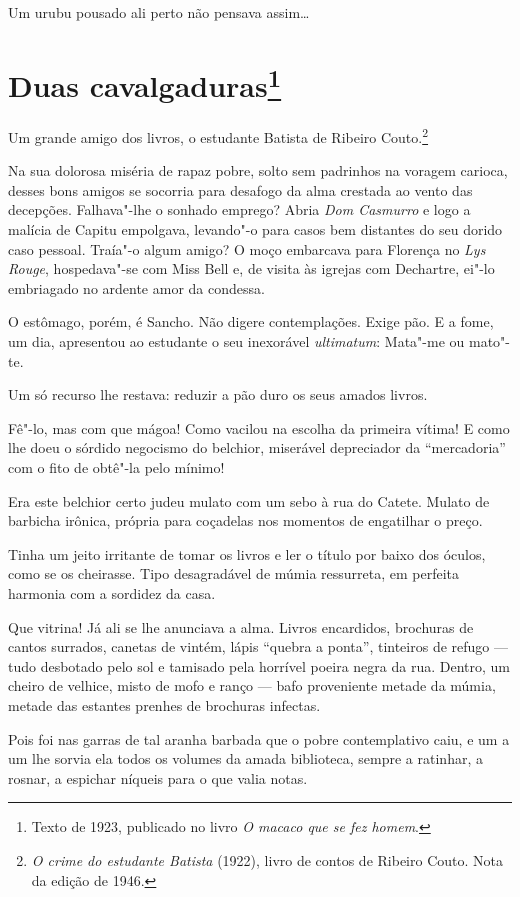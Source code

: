 Um urubu pousado ali perto não pensava assim\ldots{}

\chapter{Duas cavalgaduras\footnote[*]{Texto de 1923, publicado no livro \emph{O macaco que se fez homem}.}}

Um grande amigo dos livros, o estudante Batista de Ribeiro
Couto.\footnote{\emph{O crime do estudante Batista} (1922), livro de
  contos de Ribeiro Couto. Nota da edição de 1946.}

Na sua dolorosa miséria de rapaz pobre, solto sem padrinhos na voragem
carioca, desses bons amigos se socorria para desafogo da alma crestada
ao vento das decepções. Falhava"-lhe o sonhado emprego? Abria \emph{Dom
Casmurro} e logo a malícia de Capitu empolgava, levando"-o para casos bem
distantes do seu dorido caso pessoal. Traía"-o algum amigo? O moço
embarcava para Florença no \emph{Lys Rouge}, hospedava"-se com Miss Bell
e, de visita às igrejas com Dechartre, ei"-lo embriagado no ardente amor
da condessa.

O estômago, porém, é Sancho. Não digere contemplações. Exige pão. E a
fome, um dia, apresentou ao estudante o seu inexorável \emph{ultimatum}:
Mata"-me ou mato"-te.

Um só recurso lhe restava: reduzir a pão duro os seus amados livros.

Fê"-lo, mas com que mágoa! Como vacilou na escolha da primeira vítima! E
como lhe doeu o sórdido negocismo do belchior, miserável depreciador da
``mercadoria'' com o fito de obtê"-la pelo mínimo!

Era este belchior certo judeu mulato com um sebo à rua do Catete. Mulato
de barbicha irônica, própria para coçadelas nos momentos de engatilhar o
preço.

Tinha um jeito irritante de tomar os livros e ler o título por baixo dos
óculos, como se os cheirasse. Tipo desagradável de múmia ressurreta, em
perfeita harmonia com a sordidez da casa.

Que vitrina! Já ali se lhe anunciava a alma. Livros encardidos,
brochuras de cantos surrados, canetas de vintém, lápis ``quebra a
ponta'', tinteiros de refugo --- tudo desbotado pelo sol e tamisado pela
horrível poeira negra da rua. Dentro, um cheiro de velhice, misto de
mofo e ranço --- bafo proveniente metade da múmia, metade das estantes
prenhes de brochuras infectas.

Pois foi nas garras de tal aranha barbada que o pobre contemplativo
caiu, e um a um lhe sorvia ela todos os volumes da amada biblioteca,
sempre a ratinhar, a rosnar, a espichar níqueis para o que valia notas.

